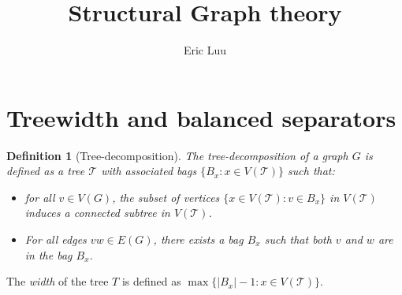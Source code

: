 \documentclass[]{article}
\title{Structural Graph theory}
\author{Eric Luu}
\newcommand{\tree}{\mathcal{T}}
\newtheorem{definition}[theorem]{Definition}
\theoremstyle{definition}
\numberwithin{theorem}{section}
\numberwithin{equation}{section}
\begin{document}
\maketitle

\section{Treewidth and balanced separators}

\begin{definition}[Tree-decomposition]
	The tree-decomposition of a graph $G$ is defined as a tree $\tree$ with associated \textit{bags} $\lbrace B_x : x \in V(\tree) \rbrace$ such that:
	\begin{itemize}
		\item for all $v \in V(G)$, the subset of vertices $\lbrace x \in V(\tree): v \in B_x \rbrace$ in $V(\tree)$ induces a connected subtree in $V(\tree)$.
		\item For all edges $vw \in E(G)$, there exists a bag $B_x$ such that both $v$ and $w$ are in the bag $B_x$.
	\end{itemize}
\end{definition}
The \textit{width} of the tree $T$ is defined as $\max \lbrace |B_x| - 1 : x \in V(\tree) \rbrace$. 
\end{document}
